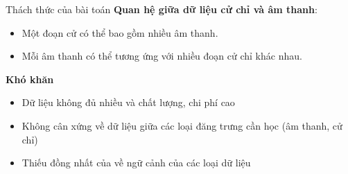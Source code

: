 \begin{frame}{Thách thức của bài toán}
	\textbf{Quan hệ giữa dữ liệu cử chỉ và âm thanh}:
	\begin{itemize}
		\item Một đoạn cử có thể bao gồm nhiều âm thanh.
		\item Mỗi âm thanh có thể tương ứng với nhiều đoạn cử chỉ khác nhau.
	\end{itemize}
	\textbf{Khó khăn}
	\begin{itemize}
		\item Dữ liệu không đủ nhiều và chất lượng, chi phí cao
		\item Không cân xứng về dữ liệu giữa các loại đăng trưng cần học (âm thanh, cử chỉ)
		\item Thiếu đồng nhất của về ngữ cảnh của các loại dữ liệu
	\end{itemize}
\end{frame}


%
%



